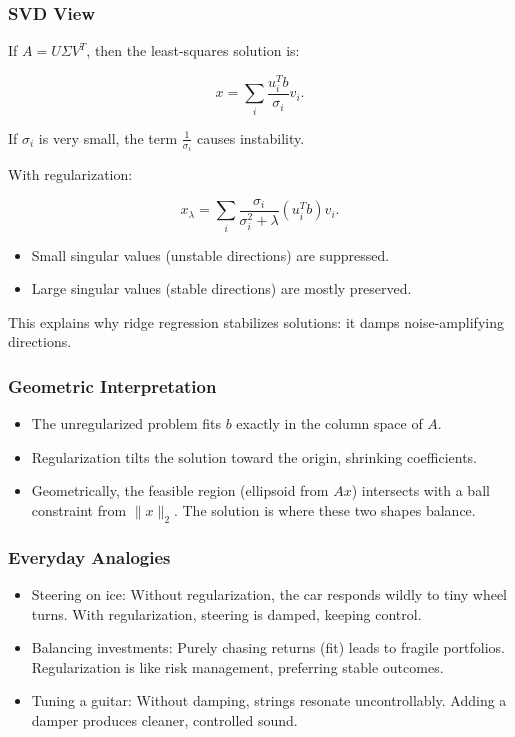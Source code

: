 \documentclass[
  letterpaper,
  DIV=11,
  numbers=noendperiod]{scrreprt}
\providecommand{\tightlist}{%
  \setlength{\itemsep}{0pt}\setlength{\parskip}{0pt}}
\begin{document}
\subsubsection{SVD View}\label{svd-view}

If \(A = U \Sigma V^T\), then the least-squares solution is:

\[
x = \sum_i \frac{u_i^T b}{\sigma_i} v_i.
\]

If \(\sigma_i\) is very small, the term \(\frac{1}{\sigma_i}\) causes
instability.

With regularization:

\[
x_\lambda = \sum_i \frac{\sigma_i}{\sigma_i^2 + \lambda} (u_i^T b) v_i.
\]

\begin{itemize}
\tightlist
\item
  Small singular values (unstable directions) are suppressed.
\item
  Large singular values (stable directions) are mostly preserved.
\end{itemize}

This explains why ridge regression stabilizes solutions: it damps
noise-amplifying directions.

\subsubsection{Geometric
Interpretation}\label{geometric-interpretation-17}

\begin{itemize}
\tightlist
\item
  The unregularized problem fits \(b\) exactly in the column space of
  \(A\).
\item
  Regularization tilts the solution toward the origin, shrinking
  coefficients.
\item
  Geometrically, the feasible region (ellipsoid from \(Ax\)) intersects
  with a ball constraint from \(\|x\|_2\). The solution is where these
  two shapes balance.
\end{itemize}

\subsubsection{Everyday Analogies}\label{everyday-analogies-84}

\begin{itemize}
\tightlist
\item
  Steering on ice: Without regularization, the car responds wildly to
  tiny wheel turns. With regularization, steering is damped, keeping
  control.
\item
  Balancing investments: Purely chasing returns (fit) leads to fragile
  portfolios. Regularization is like risk management, preferring stable
  outcomes.
\item
  Tuning a guitar: Without damping, strings resonate uncontrollably.
  Adding a damper produces cleaner, controlled sound.
\end{itemize}
\end{document}
